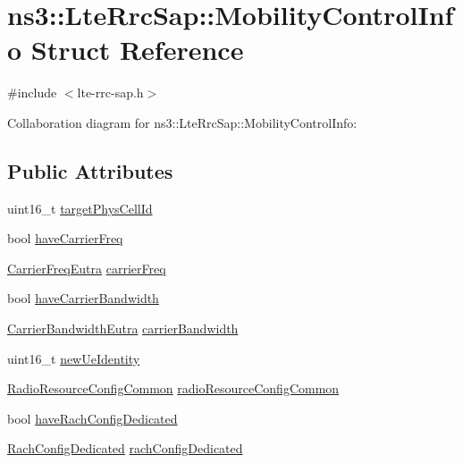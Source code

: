 \hypertarget{structns3_1_1LteRrcSap_1_1MobilityControlInfo}{}\section{ns3\+:\+:Lte\+Rrc\+Sap\+:\+:Mobility\+Control\+Info Struct Reference}
\label{structns3_1_1LteRrcSap_1_1MobilityControlInfo}


{\ttfamily \#include $<$lte-\/rrc-\/sap.\+h$>$}



Collaboration diagram for ns3\+:\+:Lte\+Rrc\+Sap\+:\+:Mobility\+Control\+Info\+:
\subsection*{Public Attributes}
\begin{DoxyCompactItemize}
\item 
uint16\+\_\+t \hyperlink{structns3_1_1LteRrcSap_1_1MobilityControlInfo_aa293cfbd25ab084f2612dff61c90a2fe}{target\+Phys\+Cell\+Id}
\item 
bool \hyperlink{structns3_1_1LteRrcSap_1_1MobilityControlInfo_a47d298d5fe992fb4208e11049504ba03}{have\+Carrier\+Freq}
\item 
\hyperlink{structns3_1_1LteRrcSap_1_1CarrierFreqEutra}{Carrier\+Freq\+Eutra} \hyperlink{structns3_1_1LteRrcSap_1_1MobilityControlInfo_a983a5aabd4cdb82a15e1cbb18275d4c0}{carrier\+Freq}
\item 
bool \hyperlink{structns3_1_1LteRrcSap_1_1MobilityControlInfo_a4520356c24c7dadd0da6bde126c2015e}{have\+Carrier\+Bandwidth}
\item 
\hyperlink{structns3_1_1LteRrcSap_1_1CarrierBandwidthEutra}{Carrier\+Bandwidth\+Eutra} \hyperlink{structns3_1_1LteRrcSap_1_1MobilityControlInfo_a614037c361e660e5b9affca92093b970}{carrier\+Bandwidth}
\item 
uint16\+\_\+t \hyperlink{structns3_1_1LteRrcSap_1_1MobilityControlInfo_a420bbe9a6369f3dd0c0190345bbbd9f3}{new\+Ue\+Identity}
\item 
\hyperlink{structns3_1_1LteRrcSap_1_1RadioResourceConfigCommon}{Radio\+Resource\+Config\+Common} \hyperlink{structns3_1_1LteRrcSap_1_1MobilityControlInfo_a075b96579355e031b7a082c512299b76}{radio\+Resource\+Config\+Common}
\item 
bool \hyperlink{structns3_1_1LteRrcSap_1_1MobilityControlInfo_a3cb42f6bf732ceffaf60183c85f3876b}{have\+Rach\+Config\+Dedicated}
\item 
\hyperlink{structns3_1_1LteRrcSap_1_1RachConfigDedicated}{Rach\+Config\+Dedicated} \hyperlink{structns3_1_1LteRrcSap_1_1MobilityControlInfo_a280524503fc4192e1bfa4a38b3bb0de0}{rach\+Config\+Dedicated}
\end{DoxyCompactItemize}


